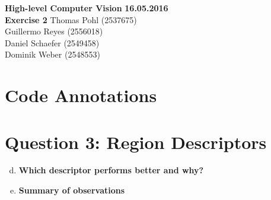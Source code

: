 \documentclass[12pt]{article}
\begin{document}

\noindent
{\Large \textbf{High-level Computer Vision}} \hfill \textbf{16.05.2016}\\
{\Large \textbf{Exercise 2}} \hfill Thomas Pohl (2537675)\\
\raggedleft \hfill Guillermo Reyes (2556018)\\
\hfill Daniel Schaefer (2549458)\\
\hfill Dominik Weber (2548553)\\

\raggedright


\section*{Code Annotations}




\section*{Question 3: Region Descriptors}

\begin{enumerate}[a)]
	\setcounter{enumi}{3}
	\item 	
	\textbf{Which descriptor performs better and why?}\\
	
	\item
	\textbf{Summary of observations}\\

\end{enumerate}

\newpage
\end{document}
